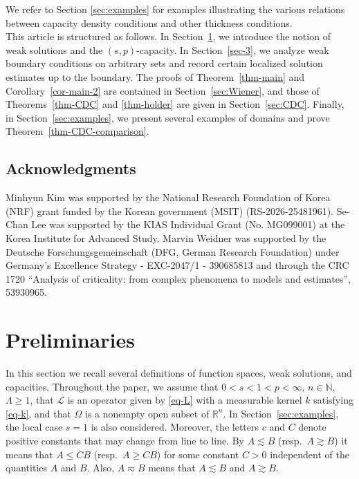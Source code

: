\documentclass[11pt]{amsart}
\theoremstyle{plain}
\theoremstyle{definition}
\numberwithin{equation}{section}
\begin{document}
We refer to Section \ref{sec:examples} for examples illustrating the various relations between capacity density conditions and other thickness conditions.\\


This article is structured as follows. In Section~\ref{sec-prelim}, we introduce the notion of weak solutions and the $(s,p)$-capacity. In Section~\ref{sec-3}, we analyze weak boundary conditions on arbitrary sets and record certain localized solution estimates up to the boundary. The proofs of Theorem~\ref{thm-main} and Corollary~\ref{cor-main-2} are contained in Section~\ref{sec:Wiener}, and those of Theorems~\ref{thm-CDC} and \ref{thm-holder} are given in Section~\ref{sec:CDC}. Finally, in Section~\ref{sec:examples}, we present several examples of domains and prove Theorem~\ref{thm-CDC-comparison}.

\subsection*{Acknowledgments}
Minhyun Kim was supported by the National Research Foundation of Korea (NRF) grant funded by the Korean government (MSIT) (RS-2026-25481961).
Se-Chan Lee was supported by the KIAS Individual Grant (No. MG099001) at the Korea Institute for Advanced Study.
Marvin Weidner was supported by the Deutsche Forschungsgemeinschaft (DFG,
German Research Foundation) under Germany's Excellence Strategy - EXC-2047/1 - 390685813 and through the CRC 1720 ``Analysis of criticality: from complex phenomena to models and estimates'', 53930965.








\section{Preliminaries}
\label{sec-prelim}

In this section we recall several definitions of function spaces, weak solutions, and capacities. Throughout the paper, we assume that $0<s<1<p<\infty$, $n \in \mathbb{N}$, $\Lambda \geq 1$, that $\mathcal{L}$ is an operator given by \eqref{eq-L} with a measurable kernel $k$ satisfying \eqref{eq-k}, and that $\Omega$ is a nonempty open subset of $\mathbb{R}^n$. In Section~\ref{sec:examples}, the local case $s=1$ is also considered. Moreover, the letters $c$ and $C$ denote positive constants that may change from line to line. By $A \lesssim B$ (resp.\ $A\gtrsim B$) it means that $A \leq CB$ (resp.\ $A \geq CB$) for some constant $C>0$ independent of the quantities $A$ and $B$. Also, $A \eqsim B$ means that $A \lesssim B$ and $A \gtrsim B$.
\end{document}
